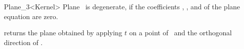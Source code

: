 \begin{ccRefClass} {Plane_3<Kernel>}
       {Plane \ccVar\ is degenerate, if the coefficients ,  
        , and  of the plane equation are zero.}


       {returns the plane obtained by applying $t$ on a point of \ccVar\ 
        and the orthogonal direction of \ccVar.}

\ccSeeAlso
{}

\end{ccRefClass} 
